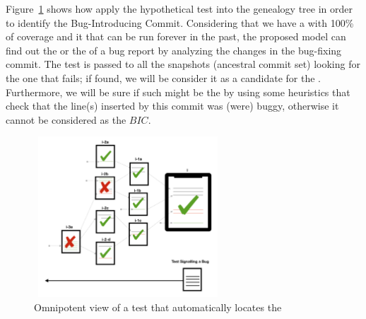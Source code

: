 \documentclass[a4paper, 12pt]{book}
\begin{document}

Figure~\ref{fig:testrecursive} shows how apply the hypothetical test into the genealogy tree in order to identify the Bug-Introducing Commit. Considering that we have a \TSB with 100\% of coverage and it that can be run forever in the past, the proposed model can find out the \BIC or the \FFC of a bug report by analyzing the changes in the bug-fixing commit. The \TSB test is passed to all the snapshots (ancestral commit set) looking for the one that fails; if found, we will be consider it as a candidate for the \BIC. Furthermore, we will be sure if such \FFC might be the \BIC by using some heuristics that check that the line(s) inserted by this commit was (were) buggy, otherwise it cannot be considered as the $BIC$.

\begin{figure}[ht]
\centering
\includegraphics[width=200pt,height=170pt]{img/testrecursive.png}
\caption{Omnipotent view of a test that automatically locates the \FFC}
\label{fig:testrecursive}       %
\end{figure}
\end{document}
